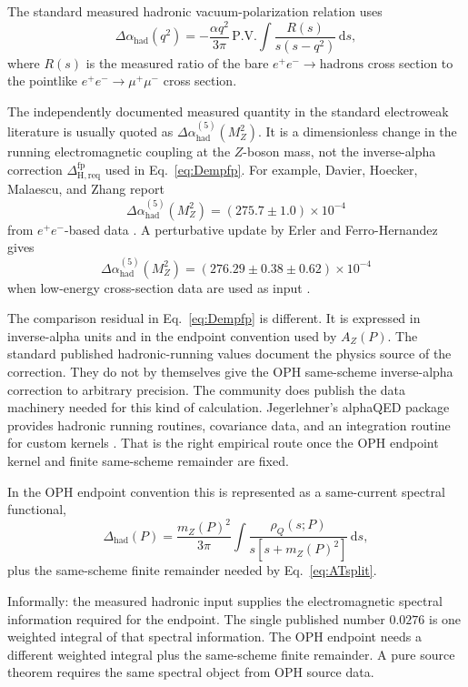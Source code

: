 \documentclass[11pt]{article}
\theoremstyle{remark}
\newcommand{\dd}{\,\mathrm d}
\newcommand{\AZ}{A_Z}
\newcommand{\Dhad}{\Delta_{\mathrm{had}}}
\newcommand{\Dhadreq}{\Delta_{\mathrm{H,req}}}
\begin{document}
The standard measured hadronic vacuum-polarization relation uses
\begin{equation}
\Delta\alpha_{\mathrm{had}}(q^2)
=
-\frac{\alpha q^2}{3\pi}\,
\mathrm{P.V.}\!\int \frac{R(s)}{s(s-q^2)}\dd s,
\label{eq:dispersion}
\end{equation}
where \(R(s)\) is the measured ratio of the bare \(e^+e^-\to\mathrm{hadrons}\) cross section to the pointlike \(e^+e^-\to\mu^+\mu^-\) cross section.

The independently documented measured quantity in the standard electroweak literature is usually quoted as \(\Delta\alpha_{\mathrm{had}}^{(5)}(M_Z^2)\). It is a dimensionless change in the running electromagnetic coupling at the \(Z\)-boson mass, not the inverse-alpha correction \(\Dhadreq^{\mathrm{fp}}\) used in Eq.~\eqref{eq:Dempfp}. For example, Davier, Hoecker, Malaescu, and Zhang report
\[
\Delta\alpha_{\mathrm{had}}^{(5)}(M_Z^2)=(275.7\pm1.0)\times10^{-4}
\]
from \(e^+e^-\)-based data \cite{dhmz}. A perturbative update by Erler and Ferro-Hernandez gives
\[
\Delta\alpha_{\mathrm{had}}^{(5)}(M_Z^2)
=\left(276.29\pm0.38\pm0.62\right)\times10^{-4}
\]
when low-energy cross-section data are used as input \cite{erler-ferro}.

The comparison residual in Eq.~\eqref{eq:Dempfp} is different. It is expressed in inverse-alpha units and in the endpoint convention used by \(\AZ(P)\). The standard published hadronic-running values document the physics source of the correction. They do not by themselves give the OPH same-scheme inverse-alpha correction to arbitrary precision. The community does publish the data machinery needed for this kind of calculation. Jegerlehner's alphaQED package provides hadronic running routines, covariance data, and an integration routine for custom kernels \cite{alphaqed}. That is the right empirical route once the OPH endpoint kernel and finite same-scheme remainder are fixed.

In the OPH endpoint convention this is represented as a same-current spectral functional,
\begin{equation}
\Dhad(P)
=
\frac{m_Z(P)^2}{3\pi}
\int \frac{\rho_Q(s;P)}{s[s+m_Z(P)^2]}\dd s,
\label{eq:ophhadron}
\end{equation}
plus the same-scheme finite remainder needed by Eq.~\eqref{eq:ATsplit}.

Informally: the measured hadronic input supplies the electromagnetic spectral information required for the endpoint. The single published number \(0.0276\) is one weighted integral of that spectral information. The OPH endpoint needs a different weighted integral plus the same-scheme finite remainder. A pure source theorem requires the same spectral object from OPH source data.
\end{document}
